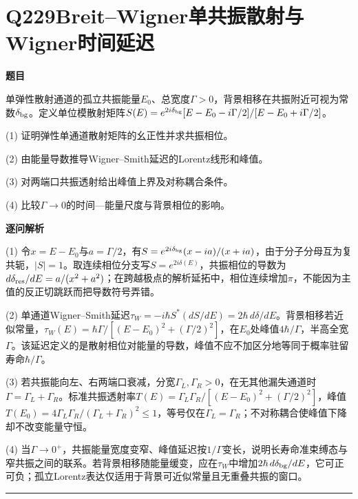 \documentclass[UTF8,a4paper,11pt,oneside,openany]{ctexbook}
\begin{document}
\section*{Q229\quad Breit–Wigner单共振散射与Wigner时间延迟}
\textbf{题目}\par
单弹性散射通道的孤立共振能量$E_0$、总宽度$\Gamma>0$，背景相移在共振附近可视为常数$\delta_{\rm bg}$。定义单位模散射矩阵$S(E)=e^{2i\delta_{\rm bg}}[E-E_0-i\Gamma/2]/[E-E_0+i\Gamma/2]$。
\par\smallskip\noindent (1) 证明弹性单通道散射矩阵的幺正性并求共振相位。
\par\smallskip\noindent (2) 由能量导数推导Wigner–Smith延迟的Lorentz线形和峰值。
\par\smallskip\noindent (3) 对两端口共振透射给出峰值上界及对称耦合条件。
\par\smallskip\noindent (4) 比较$\Gamma\to0$的时间—能量尺度与背景相位的影响。
\par\medskip\textbf{逐问解析}\par
\par\smallskip\noindent (1) 令$x=E-E_0$与$a=\Gamma/2$，有$S=e^{2i\delta_{\rm bg}}(x-ia)/(x+ia)$，由于分子分母互为复共轭，$|S|=1$。取连续相位分支写$S=e^{2i\delta(E)}$，共振相位的导数为$d\delta_{\rm res}/dE=a/(x^2+a^2)$；在跨越极点的解析延拓中，相位连续增加$\pi$，不能因为主值的反正切跳跃而把导数符号弄错。
\par\smallskip\noindent (2) 单通道Wigner–Smith延迟$\tau_W=-i\hbar S^*(dS/dE)=2\hbar\,d\delta/dE$。背景相移若近似常量，$\tau_W(E)=\hbar\Gamma/[(E-E_0)^2+(\Gamma/2)^2]$，在$E_0$处峰值$4\hbar/\Gamma$，半高全宽$\Gamma$。该延迟定义的是散射相位对能量的导数，峰值不应不加区分地等同于概率驻留寿命$\hbar/\Gamma$。
\par\smallskip\noindent (3) 若共振能向左、右两端口衰减，分宽$\Gamma_L,\Gamma_R>0$，在无其他漏失通道时$\Gamma=\Gamma_L+\Gamma_R$。标准共振透射率$T(E)=\Gamma_L\Gamma_R/[(E-E_0)^2+(\Gamma/2)^2]$，峰值$T(E_0)=4\Gamma_L\Gamma_R/(\Gamma_L+\Gamma_R)^2\le1$，等号仅在$\Gamma_L=\Gamma_R$；不对称耦合使峰值下降却不改变能量守恒。
\par\smallskip\noindent (4) 当$\Gamma\to0^+$，共振能量宽度变窄、峰值延迟按$1/\Gamma$变长，说明长寿命准束缚态与窄共振之间的联系。若背景相移随能量缓变，应在$\tau_W$中增加$2\hbar\,d\delta_{\rm bg}/dE$，它可正可负；孤立Lorentz表达仅适用于背景可近似常量且无重叠共振的窗口。
\par\medskip\hrule\medskip
\end{document}
